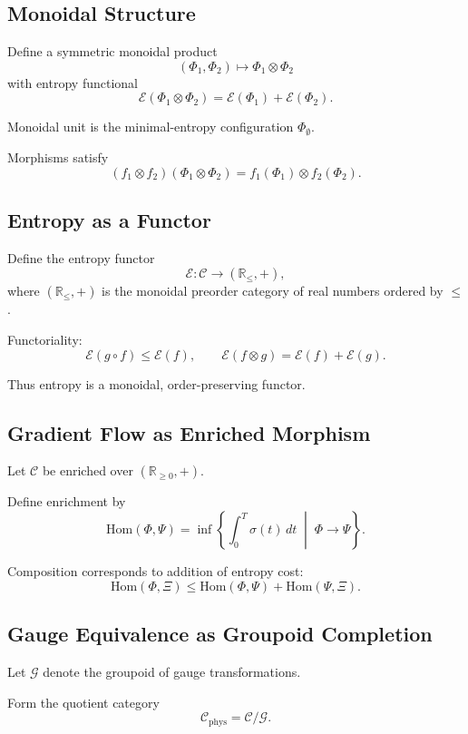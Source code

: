 \documentclass[11pt]{article}
\begin{document}
\subsection*{Monoidal Structure}

Define a symmetric monoidal product
\[
(\Phi_1,\Phi_2) \mapsto \Phi_1 \otimes \Phi_2
\]
with entropy functional
\[
\mathcal{E}(\Phi_1 \otimes \Phi_2)
=
\mathcal{E}(\Phi_1) + \mathcal{E}(\Phi_2).
\]

Monoidal unit is the minimal-entropy configuration $\Phi_\emptyset$.

Morphisms satisfy
\[
(f_1 \otimes f_2)(\Phi_1 \otimes \Phi_2)
=
f_1(\Phi_1)\otimes f_2(\Phi_2).
\]

\subsection*{Entropy as a Functor}

Define the entropy functor
\[
\mathcal{E} : \mathcal{C} \to (\mathbb{R}_{\le}, +),
\]
where $(\mathbb{R}_{\le},+)$ is the monoidal preorder category of real numbers
ordered by $\le$.

Functoriality:
\[
\mathcal{E}(g\circ f) \le \mathcal{E}(f),
\qquad
\mathcal{E}(f\otimes g)=\mathcal{E}(f)+\mathcal{E}(g).
\]

Thus entropy is a monoidal, order-preserving functor.

\subsection*{Gradient Flow as Enriched Morphism}

Let $\mathcal{C}$ be enriched over $(\mathbb{R}_{\ge 0},+)$.

Define enrichment by
\[
\mathrm{Hom}(\Phi,\Psi) = \inf \left\{
\int_0^T \sigma(t)\,dt
\;\middle|\;
\Phi \to \Psi
\right\}.
\]

Composition corresponds to addition of entropy cost:
\[
\mathrm{Hom}(\Phi,\Xi)
\le
\mathrm{Hom}(\Phi,\Psi)+\mathrm{Hom}(\Psi,\Xi).
\]

\subsection*{Gauge Equivalence as Groupoid Completion}

Let $\mathcal{G}$ denote the groupoid of gauge transformations.

Form the quotient category
\[
\mathcal{C}_{\text{phys}} = \mathcal{C}/\mathcal{G}.
\]
\end{document}
